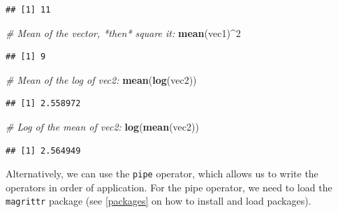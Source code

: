 \documentclass[]{book}
\newenvironment{Shaded}{\begin{snugshade}}{\end{snugshade}}
\newcommand{\CommentTok}[1]{\textcolor[rgb]{0.56,0.35,0.01}{\textit{#1}}}
\newcommand{\DecValTok}[1]{\textcolor[rgb]{0.00,0.00,0.81}{#1}}
\newcommand{\KeywordTok}[1]{\textcolor[rgb]{0.13,0.29,0.53}{\textbf{#1}}}
\newcommand{\NormalTok}[1]{#1}
\newcommand{\OperatorTok}[1]{\textcolor[rgb]{0.81,0.36,0.00}{\textbf{#1}}}
\newcommand{\StringTok}[1]{\textcolor[rgb]{0.31,0.60,0.02}{#1}}
\begin{document}
\begin{verbatim}
## [1] 11
\end{verbatim}

\begin{Shaded}
\begin{Highlighting}[]
\CommentTok{# Mean of the vector, *then* square it:}
\KeywordTok{mean}\NormalTok{(vec1)}\OperatorTok{^}\DecValTok{2}
\end{Highlighting}
\end{Shaded}

\begin{verbatim}
## [1] 9
\end{verbatim}

\begin{Shaded}
\begin{Highlighting}[]
\CommentTok{# Mean of the log of vec2:}
\KeywordTok{mean}\NormalTok{(}\KeywordTok{log}\NormalTok{(vec2))}
\end{Highlighting}
\end{Shaded}

\begin{verbatim}
## [1] 2.558972
\end{verbatim}

\begin{Shaded}
\begin{Highlighting}[]
\CommentTok{# Log of the mean of vec2:}
\KeywordTok{log}\NormalTok{(}\KeywordTok{mean}\NormalTok{(vec2))}
\end{Highlighting}
\end{Shaded}

\begin{verbatim}
## [1] 2.564949
\end{verbatim}

Alternatively, we can use the \texttt{pipe} operator, which allows us to write the operators in order of application. For the pipe operator, we need to load the \texttt{magrittr} package (see \ref{packages} on how to install and load packages).

\begin{Shaded}
\end{Shaded}
\end{document}
